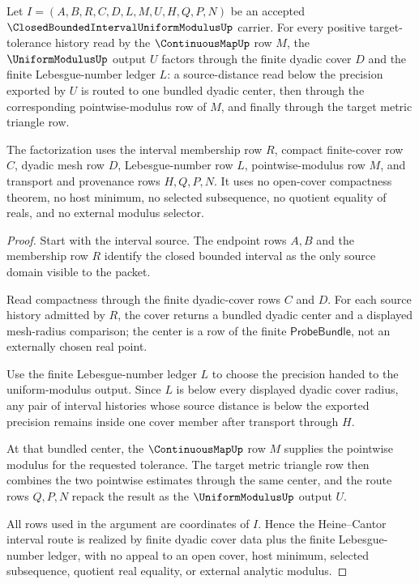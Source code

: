 \begin{theorem}
\label{thm:closed-bounded-interval-uniform-modulus-heine-cantor-route}
Let $I=(A,B,R,C,D,L,M,U,H,Q,P,N)$ be an accepted $\ClosedBoundedIntervalUniformModulusUp$ carrier. For every positive target-tolerance history read by the $\ContinuousMapUp$ row $M$, the $\UniformModulusUp$ output $U$ factors through the finite dyadic cover $D$ and the finite Lebesgue-number ledger $L$: a source-distance read below the precision exported by $U$ is routed to one bundled dyadic center, then through the corresponding pointwise-modulus row of $M$, and finally through the target metric triangle row.

The factorization uses the interval membership row $R$, compact finite-cover row $C$, dyadic mesh row $D$, Lebesgue-number row $L$, pointwise-modulus row $M$, and transport and provenance rows $H,Q,P,N$. It uses no open-cover compactness theorem, no host minimum, no selected subsequence, no quotient equality of reals, and no external modulus selector.
\end{theorem}
\begin{proof}
Start with the interval source. The endpoint rows $A,B$ and the membership row $R$ identify the closed bounded interval as the only source domain visible to the packet.

Read compactness through the finite dyadic-cover rows $C$ and $D$. For each source history admitted by $R$, the cover returns a bundled dyadic center and a displayed mesh-radius comparison; the center is a row of the finite $\mathsf{ProbeBundle}$, not an externally chosen real point.

Use the finite Lebesgue-number ledger $L$ to choose the precision handed to the uniform-modulus output. Since $L$ is below every displayed dyadic cover radius, any pair of interval histories whose source distance is below the exported precision remains inside one cover member after transport through $H$.

At that bundled center, the $\ContinuousMapUp$ row $M$ supplies the pointwise modulus for the requested tolerance. The target metric triangle row then combines the two pointwise estimates through the same center, and the route rows $Q,P,N$ repack the result as the $\UniformModulusUp$ output $U$.

All rows used in the argument are coordinates of $I$. Hence the Heine--Cantor interval route is realized by finite dyadic cover data plus the finite Lebesgue-number ledger, with no appeal to an open cover, host minimum, selected subsequence, quotient real equality, or external analytic modulus.
\end{proof}

